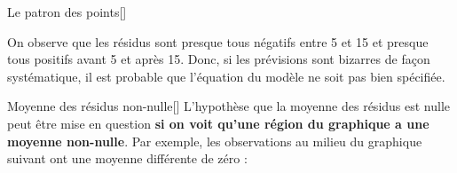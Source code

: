 \documentclass[french]{article}
\begin{document}
\begin{multicols*}{2}
\begin{definitionGENERAL}{Le patron des points}[]
\begin{center}
\end{center}

On observe que les résidus sont presque tous négatifs entre 5 et 15 et presque tous positifs avant 5 et après 15. Donc, si les prévisions sont bizarres de façon systématique, il est probable que l'équation du modèle ne soit pas bien spécifiée.
\end{definitionGENERAL}

\begin{definitionGENERAL}{Moyenne des résidus non-nulle}[]
L'hypothèse que la moyenne des résidus est nulle peut être mise en question \textbf{si on voit qu'une région du graphique a une moyenne non-nulle}. Par exemple, les observations au milieu du graphique suivant ont une moyenne différente de zéro : 
\begin{center}
\begin{tikzpicture}[x=0.75pt,y=0.75pt,yscale=-1,xscale=1]


\end{tikzpicture}
\end{center}
\end{definitionGENERAL}
\end{multicols*}
\end{document}
